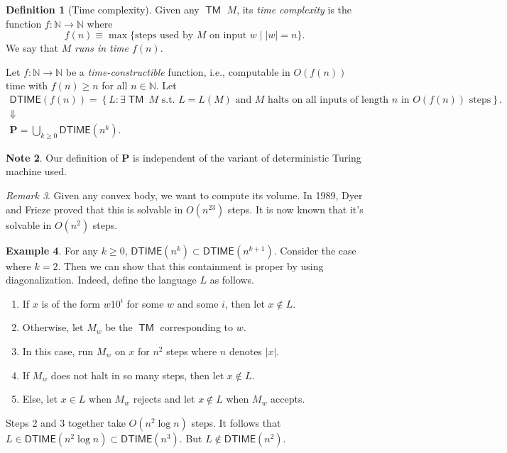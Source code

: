 \documentclass[10pt,letterpaper,cm]{nupset}
\theoremstyle{definition}
\newtheorem{definition}{Definition}[subsection]
\newtheorem{exmp}[definition]{Example}
\newtheorem{note}[definition]{Note}
\theoremstyle{theorem}
\theoremstyle{remark}
\newtheorem{remark}[definition]{Remark}
\newcommand{\N}{\mathbb N}
\newcommand{\1}{\mathbf{1}}
\newcommand{\0}{\vec 0}
\DeclareMathOperator{\TM}{\mathsf{TM}}
\begin{document}
\smallskip

\begin{definition}[Time complexity]
Given any $\TM$ $M$, its \textit{time complexity} is the function $f: \N \to \N$ where $$f(n) \equiv\max\{\text{steps used by }M \text{ on input }w\mid \left\lvert{w}\right\rvert =n\}.$$ We say that $M$ \textit{runs in time $f(n)$}.
\end{definition}

\smallskip

Let $f: \N \to \N$ be a \textit{time-constructible} function, i.e., computable in $O(f(n))$ time with $f(n)\geq n$ for all $n\in \N$. Let 
\begin{gather*}
\mathsf{DTIME}(f(n))  = \left\{ L : \exists \TM \ M  \text{ s.t. } L = L(M) \text{ and }M \text{ halts on all inputs of length }n \text{ in }O(f(n)) \text{ steps}\right\}.
\\  \Downarrow
\\
 \mathbf{P}  = \bigcup_{k\geq 0} \mathsf{DTIME}\left(n^k\right)
.
\end{gather*}


\begin{note}
Our definition of $\mathbf{P}$ is independent of the variant of deterministic Turing machine used. 
\end{note}

\begin{remark}
Given any convex body, we want to compute its volume. In 1989, Dyer and Frieze proved that this is solvable in $O\left(n^{23}\right)$ steps. It is now known that it's solvable in $O\left(n^2\right)$ steps. 
\end{remark}

\begin{exmp}
For any $k\geq 0$, $\mathsf{DTIME}(n^k) \subset \mathsf{DTIME}(n^{k+1})$. Consider the case where $k=2$. Then we can show that this containment  is proper by using diagonalization. Indeed, define the language $L$ as follows. 
\begin{enumerate}
\item If $x$ is of the form $w10^i$ for some $w$ and some $i$, then let $x\notin L$.
\item Otherwise, let $M_w$ be the $\TM$ corresponding to $w$. 
\item In this case, run $M_w$ on $x$ for $n^2$ steps where $n$ denotes $\left\lvert{x}\right\rvert$. 
\item  If $M_w$ does not halt in so many steps, then let $x\notin L$. 
\item Else, let $x\in L$ when $M_w$ rejects and let $x\notin L$ when $M_w$ accepts. 
\end{enumerate}
Steps 2 and 3 together take $O\left(n^2 \log{n}\right)$ steps. It follows that $L \in \mathsf{DTIME}(n^2\log{n})\subset \mathsf{DTIME}(n^3)$. But $L \notin \mathsf{DTIME}(n^2)$.
\end{exmp}
\end{document}
